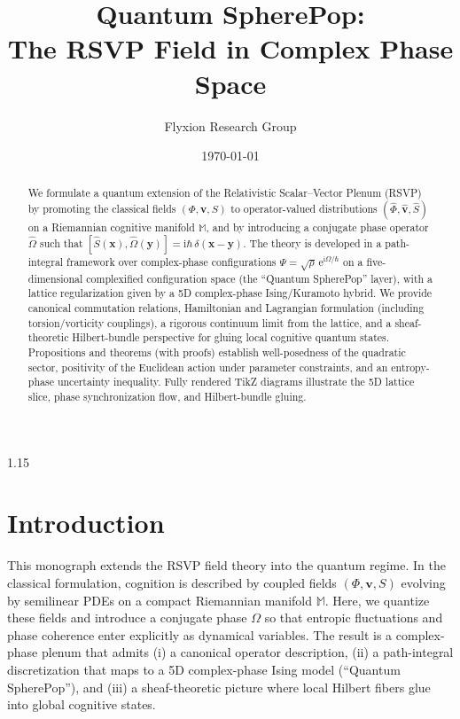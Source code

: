 \documentclass[12pt,a4paper]{article}
\title{\Huge\textbf{Quantum SpherePop:\\ The RSVP Field in Complex Phase Space}}
\author{Flyxion Research Group}
\date{\today}
\numberwithin{equation}{section}
\theoremstyle{definition}
\theoremstyle{plain}
\theoremstyle{remark}
\newcommand{\M}{\mathbb{M}}
\newcommand{\hPhi}{\hat{\Phi}}
\newcommand{\hv}{\hat{\mathbf{v}}}
\newcommand{\hS}{\hat{S}}
\newcommand{\hO}{\hat{\Omega}}
\newcommand{\e}{\mathrm{e}}
\newcommand{\ii}{\mathrm{i}}
\begin{document}
\maketitle
\begin{spacing}{1.15}

\begin{abstract}
We formulate a quantum extension of the Relativistic Scalar--Vector Plenum (RSVP) by promoting the classical fields $(\Phi,\mathbf{v},S)$ to operator-valued distributions $(\hPhi,\hv,\hS)$ on a Riemannian cognitive manifold $\M$, and by introducing a conjugate phase operator $\hO$ such that $[\hS(\mathbf{x}),\hO(\mathbf{y})]=\ii\hbar\,\delta(\mathbf{x}-\mathbf{y})$. The theory is developed in a path-integral framework over complex-phase configurations $\Psi=\sqrt{\rho}\,\e^{\ii \Omega/\hbar}$ on a five-dimensional complexified configuration space (the ``Quantum SpherePop'' layer), with a lattice regularization given by a 5D complex-phase Ising/Kuramoto hybrid. We provide canonical commutation relations, Hamiltonian and Lagrangian formulation (including torsion/vorticity couplings), a rigorous continuum limit from the lattice, and a sheaf-theoretic Hilbert-bundle perspective for gluing local cognitive quantum states. Propositions and theorems (with proofs) establish well-posedness of the quadratic sector, positivity of the Euclidean action under parameter constraints, and an entropy-phase uncertainty inequality. Fully rendered TikZ diagrams illustrate the 5D lattice slice, phase synchronization flow, and Hilbert-bundle gluing.
\end{abstract}

\tableofcontents

\section{Introduction}\label{sec:intro}
This monograph extends the RSVP field theory into the quantum regime. In the classical formulation, cognition is described by coupled fields $(\Phi,\mathbf{v},S)$ evolving by semilinear PDEs on a compact Riemannian manifold $\M$. Here, we quantize these fields and introduce a conjugate phase $\Omega$ so that entropic fluctuations and phase coherence enter explicitly as dynamical variables. The result is a complex-phase plenum that admits (i) a canonical operator description, (ii) a path-integral discretization that maps to a 5D complex-phase Ising model (``Quantum SpherePop''), and (iii) a sheaf-theoretic picture where local Hilbert fibers glue into global cognitive states.


\end{spacing}
\end{document}
